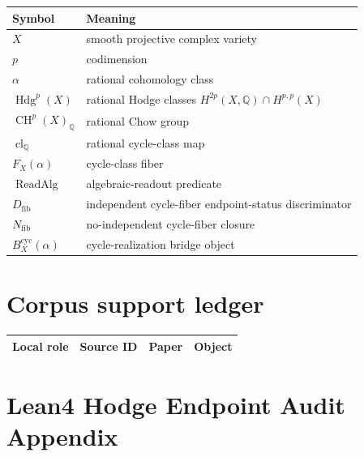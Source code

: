 \documentclass[11pt]{article}
\newcommand{\QQ}{\mathbb{Q}}
\newcommand{\CH}{\operatorname{CH}}
\newcommand{\Hdg}{\operatorname{Hdg}}
\newcommand{\clQ}{\operatorname{cl}_{\QQ}}
\newcommand{\ReadAlg}{\operatorname{ReadAlg}}
\newcommand{\Bridge}{B^{\mathrm{cyc}}_X(\alpha)}
\begin{document}
\begin{longtable}{p{}p{}}
\toprule Symbol & Meaning\\ \midrule\endhead
$X$ & smooth projective complex variety\\
$p$ & codimension\\
$\alpha$ & rational cohomology class\\
$\Hdg^p(X)$ & rational Hodge classes $H^{2p}(X,\QQ)\cap H^{p,p}(X)$\\
$\CH^p(X)_\QQ$ & rational Chow group\\
$\clQ$ & rational cycle-class map\\
$F_X(\alpha)$ & cycle-class fiber\\
$\ReadAlg$ & algebraic-readout predicate\\
$D_{\mathrm{fib}}$ & independent cycle-fiber endpoint-status discriminator\\
$N_{\mathrm{fib}}$ & no-independent cycle-fiber closure\\
$\Bridge$ & cycle-realization bridge object\\
\bottomrule
\end{longtable}

\section{Corpus support ledger}\label{app:corpus-support}


{\scriptsize
\begin{longtable}{p{}p{}p{}p{}}
\toprule Local role & Source ID & Paper & Object\\ \midrule\endhead

\end{longtable}
}


\section{Lean4 Hodge Endpoint Audit Appendix}\label{app:lean}
\end{document}
